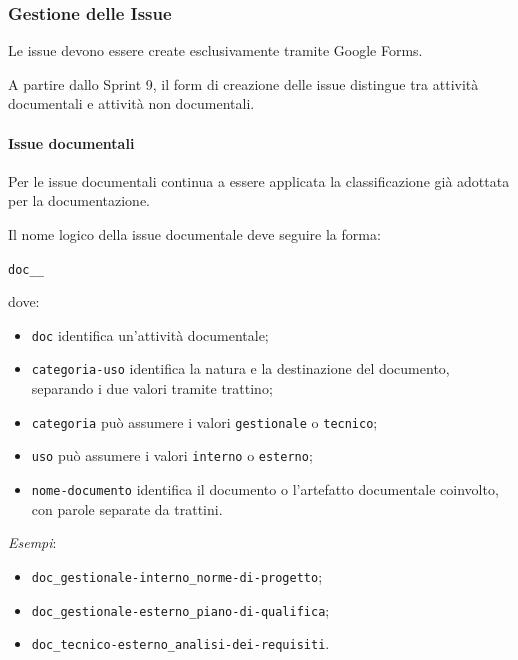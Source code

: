 
\subsubsection{Gestione delle Issue}

Le issue devono essere create esclusivamente tramite Google Forms.

A partire dallo Sprint 9, il form di creazione delle issue distingue tra attività
documentali e attività non documentali.

\paragraph{Issue documentali}

Per le issue documentali continua a essere applicata la classificazione già
adottata per la documentazione.

Il nome logico della issue documentale deve seguire la forma:

\begin{center}
    \texttt{doc\_<categoria-uso>\_<nome-documento>}
\end{center}

dove:

\begin{itemize}
    \item \texttt{doc} identifica un'attività documentale;
    \item \texttt{categoria-uso} identifica la natura e la destinazione del documento,
    separando i due valori tramite trattino;
    \item \texttt{categoria} può assumere i valori \texttt{gestionale} o
    \texttt{tecnico};
    \item \texttt{uso} può assumere i valori \texttt{interno} o \texttt{esterno};
    \item \texttt{nome-documento} identifica il documento o l'artefatto documentale
    coinvolto, con parole separate da trattini.
\end{itemize}

\textit{Esempi}:

\begin{itemize}
    \item \texttt{doc\_gestionale-interno\_norme-di-progetto};
    \item \texttt{doc\_gestionale-esterno\_piano-di-qualifica};
    \item \texttt{doc\_tecnico-esterno\_analisi-dei-requisiti}.
\end{itemize}

